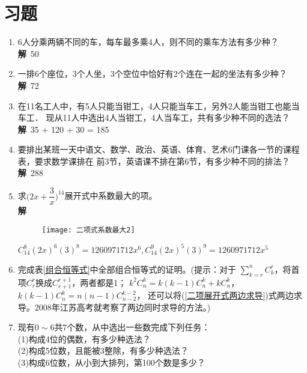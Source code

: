 \section{习题}
\begin{enumerate}[label={\textbf{\arabic*.}},leftmargin=
    \inteval{\myenumleftmargin}pt]
\item 6人分乘两辆不同的车，每车最多乘4人，则不同的乘车方法有多少种？
\ifteach \\ \textbf{解}\ 
50
\fi

\item 一排6个座位，3个人坐，3个空位中恰好有2个连在一起的坐法有多少种？
\ifteach \\ \textbf{解}\ 
72
\fi

\item 在11名工人中，有5人只能当钳工，4人只能当车工，另外2人能当钳工也能当车工．
现从11人中选出4人当钳工，4人当车工，共有多少种不同的选法？
\ifteach \\ \textbf{解}\ 
35 + 120 + 30 = 185
\fi

\item 要排出某班一天中语文、数学、政治、英语、体育、艺术6门课各一节的课程表，要求数学课排在
前3节，英语课不排在第6节，有多少种不同的排法？
\ifteach \\ \textbf{解}\ 
288
\fi 

\item 求$ \Big(2x+\dfrac{3}{x}\Big)^{14} $展开式中系数最大的项。
\ifteach \\ \textbf{解}\ 
\begin{figure}[h]
    \centering
    \texttt{[image: 二项式系数最大2]}
\end{figure}
$ C_{14}^{8}(2x)^6(3)^8=1260971712x^{6},C_{14}^{9}(2x)^5(3)^9=1260971712x^{5} $
\fi

\item 完成表\ref{组合恒等式}中全部组合恒等式的证明。(提示：对于
$ \sum\limits_{k=r}^{n} C_k^r $，将首项$ C_r^r $换成$ C_{r+1}^{r+1} $，两者都是1；
$ k^2C_n^k=k(k-1)C_n^k+kC_n^k $，$ k(k-1)C_n^k=n(n-1)C_{n-2}^{k-2} $，
还可以将(\ref{二项展开式两边求导})式两边求导。2008年江苏高考就考察了两边同时求导的方法。)

\item 现有$ 0\sim 6 $共7个数，从中选出一些数完成下列任务：\\
(1)构成4位的偶数，有多少种选法？\\
(2)构成5位数，且能被3整除，有多少种选法？\\
(3)构成6位数，从小到大排列，第100个数是多少？


\end{enumerate}
